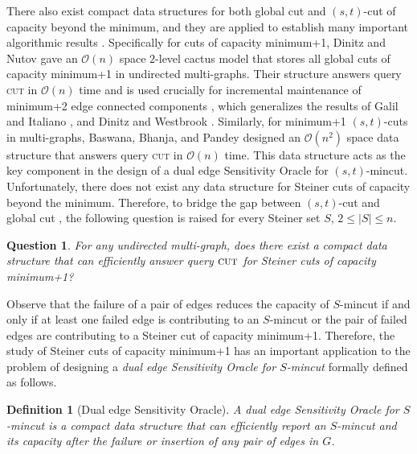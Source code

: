 \documentclass[letterpaper,11pt]{article}
\newtheorem{question}{Question}[]
\newtheorem{definition}{Definition}[]
\begin{document}
There also exist compact data structures for both global cut \cite{DBLP:conf/stoc/DinitzN95, DBLP:journals/jacm/KawarabayashiT19, DBLP:conf/focs/Benczur95} and $(s,t)$-cut \cite{DBLP:journals/talg/BaswanaBP23} of capacity beyond the minimum, and they are applied to establish many important algorithmic results \cite{DBLP:journals/jacm/KawarabayashiT19, DBLP:conf/focs/Benczur95, DBLP:conf/stoc/DinitzN95, DBLP:journals/talg/BaswanaBP23, DBLP:journals/talg/GoranciHT18}. Specifically for cuts of capacity minimum+1, Dinitz and Nutov \cite{DBLP:conf/stoc/DinitzN95} gave an ${\mathcal O}(n)$ space $2$-level cactus model that stores all global cuts of capacity minimum+1 in undirected multi-graphs. Their structure answers query \textsc{cut} in ${\mathcal O}(n)$ time and is used crucially for incremental maintenance of minimum+2 edge connected components \cite{DBLP:conf/stoc/DinitzN95}, which generalizes the results of Galil and Italiano \cite{DBLP:journals/siamcomp/GalilI93}, and Dinitz and Westbrook \cite{DBLP:conf/istcs/Dinitz93, DBLP:journals/algorithmica/DinitzW98}.
Similarly, for minimum+1 $(s,t)$-cuts in multi-graphs, Baswana, Bhanja, and Pandey \cite{DBLP:journals/talg/BaswanaBP23} designed an ${\mathcal O}(n^2)$ space data structure that answers query \textsc{cut} in ${\mathcal O}(n)$ time. This data structure acts as the key component in the design of a dual edge Sensitivity Oracle for $(s,t)$-mincut. 
Unfortunately, there does not exist any data structure for Steiner cuts of capacity beyond the minimum. Therefore, to bridge the gap between $(s,t)$-cut \cite{DBLP:journals/talg/BaswanaBP23} and global cut \cite{DBLP:conf/stoc/DinitzN95}, the following question is raised for every Steiner set $S$, $2\le |S| \le n$.
\begin{question} \label{ques : data structure}
    For any undirected multi-graph, does there exist a compact data structure that can efficiently answer query $\textsc{cut}$ for Steiner cuts of capacity minimum+1?
\end{question}
Observe that the failure of a pair of edges reduces the capacity of $S$-mincut if and only if at least one failed edge is contributing to an $S$-mincut or the pair of failed edges are contributing to a Steiner cut of capacity minimum+1. Therefore, the study of Steiner cuts of capacity minimum+1 has an important application to the problem of designing a \textit{dual edge Sensitivity Oracle for $S$-mincut} formally defined as follows.
\begin{definition} [Dual edge Sensitivity Oracle] \label{def : dual edge sensitivity oracle}
    A dual edge Sensitivity Oracle for $S$-mincut is a compact data structure that can efficiently report an $S$-mincut and its capacity after the failure or insertion of any pair of edges in $G$. 
\end{definition}
\end{document}
